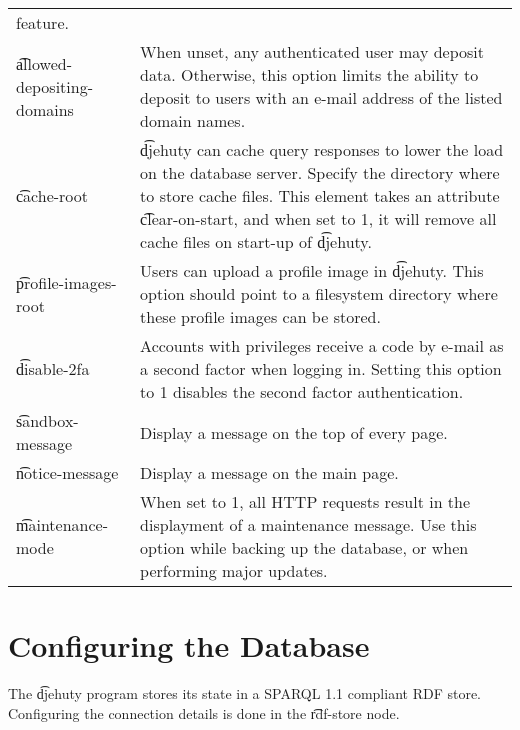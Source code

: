 \begin{tabular}{p{} p{}}
                               feature.\\
  \t{allowed-depositing-domains} & When unset, any authenticated user may
                               deposit data.  Otherwise, this option limits the
                               ability to deposit to users with an e-mail
                               address of the listed domain names.\\
  \t{cache-root}             & \t{djehuty} can cache query responses to lower
                               the load on the database server.  Specify the
                               directory where to store cache files.  This
                               element takes an attribute \t{clear-on-start},
                               and when set to 1, it will remove all cache files
                               on start-up of \t{djehuty}.\\
  \t{profile-images-root}    & Users can upload a profile image in \t{djehuty}.
                               This option should point to a filesystem directory
                               where these profile images can be stored.\\
  \t{disable-2fa}            & Accounts with privileges receive a code by e-mail
                               as a second factor when logging in.  Setting this
                               option to 1 disables the second factor
                               authentication.\\
  \t{sandbox-message}        & Display a message on the top of every page.\\
  \t{notice-message}         & Display a message on the main page.\\
  \t{maintenance-mode}       & When set to 1, all HTTP requests result in the
                               displayment of a maintenance message. Use this
                               option while backing up the database, or when
                               performing major updates.\\
\end{tabular}

\section{Configuring the Database}

  The \t{djehuty} program stores its state in a SPARQL 1.1 compliant
  RDF store.  Configuring the connection details is done in the
  \t{rdf-store} node.

